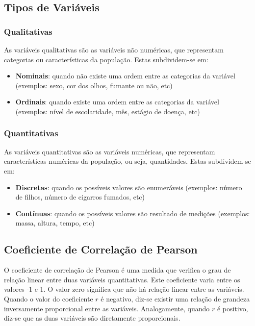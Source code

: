 \documentclass[
]{estat/estat}
\providecommand{\tightlist}{%
  \setlength{\itemsep}{0pt}\setlength{\parskip}{0pt}}\usepackage{longtable,booktabs,array}
\begin{document}
\subsection{Tipos de Variáveis}\label{tipos-de-variuxe1veis}

\subsubsection{Qualitativas}\label{qualitativas}

As variáveis qualitativas são as variáveis não numéricas, que
representam categorias ou características da população. Estas
subdividem-se em:

\begin{itemize}
\tightlist
\item
  \textbf{Nominais}: quando não existe uma ordem entre as categorias da
  variável (exemplos: sexo, cor dos olhos, fumante ou não, etc)
\item
  \textbf{Ordinais}: quando existe uma ordem entre as categorias da
  variável (exemplos: nível de escolaridade, mês, estágio de doença,
  etc)
\end{itemize}

\subsubsection{Quantitativas}\label{quantitativas}

As variáveis quantitativas são as variáveis numéricas, que representam
características numéricas da população, ou seja, quantidades. Estas
subdividem-se em:

\begin{itemize}
\tightlist
\item
  \textbf{Discretas}: quando os possíveis valores são enumeráveis
  (exemplos: número de filhos, número de cigarros fumados, etc)
\item
  \textbf{Contínuas}: quando os possíveis valores são resultado de
  medições (exemplos: massa, altura, tempo, etc)
\end{itemize}

\subsection{Coeficiente de Correlação de
Pearson}\label{coeficiente-de-correlauxe7uxe3o-de-pearson}

O coeficiente de correlação de Pearson é uma medida que verifica o grau
de relação linear entre duas variáveis quantitativas. Este coeficiente
varia entre os valores -1 e 1. O valor zero significa que não há relação
linear entre as variáveis. Quando o valor do coeficiente \(r\) é
negativo, diz-se existir uma relação de grandeza inversamente
proporcional entre as variáveis. Analogamente, quando \(r\) é positivo,
diz-se que as duas variáveis são diretamente proporcionais.
\end{document}
